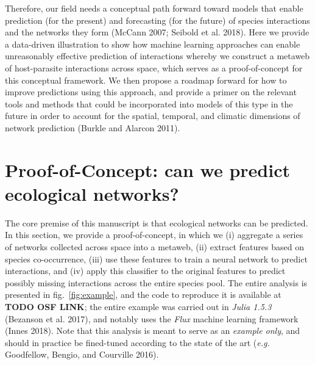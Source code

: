 \documentclass[10pt,oneside]{article}
\begin{document}
Therefore, our field needs a conceptual path forward toward models that
enable prediction (for the present) and forecasting (for the future) of
species interactions and the networks they form (McCann 2007; Seibold et
al. 2018). Here we provide a data-driven illustration to show how
machine learning approaches can enable unreasonably effective prediction
of interactions whereby we construct a metaweb of host-parasite
interactions across space, which serves as a proof-of-concept for this
conceptual framework. We then propose a roadmap forward for how to
improve predictions using this approach, and provide a primer on the
relevant tools and methods that could be incorporated into models of
this type in the future in order to account for the spatial, temporal,
and climatic dimensions of network prediction (Burkle and Alarcon 2011).

\hypertarget{proof-of-concept-can-we-predict-ecological-networks}{%
\section{Proof-of-Concept: can we predict ecological
networks?}\label{proof-of-concept-can-we-predict-ecological-networks}}

The core premise of this manuscript is that ecological networks can be
predicted. In this section, we provide a proof-of-concept, in which we
(i) aggregate a series of networks collected across space into a
metaweb, (ii) extract features based on species co-occurrence, (iii) use
these features to train a neural network to predict interactions, and
(iv) apply this classifier to the original features to predict possibly
missing interactions across the entire species pool. The entire analysis
is presented in fig.~\ref{fig:example}, and the code to reproduce it is
available at \textbf{TODO OSF LINK}; the entire example was carried out
in \emph{Julia 1.5.3} (Bezanson et al. 2017), and notably uses the
\emph{Flux} machine learning framework (Innes 2018). Note that this
analysis is meant to serve as an \emph{example only}, and should in
practice be fined-tuned according to the state of the art (\emph{e.g.}
Goodfellow, Bengio, and Courville 2016).
\end{document}
